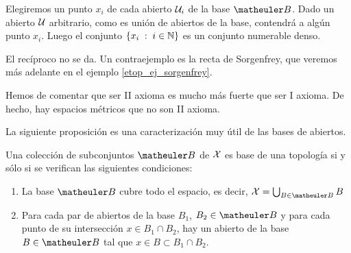 \begin{obs}
	Elegiremos un punto $x_i$ de cada abierto $\mathcal{U}_i$ de la base $\B$. Dado un abierto $\mathcal{U}$ arbitrario, como es unión de abiertos de la base, contendrá a algún punto $x_i$. Luego el conjunto $\{x_i\;:\; i\in\mathbb{N}\}$ es un conjunto numerable denso.
	
	El recíproco no se da. Un contraejemplo es la recta de Sorgenfrey, que veremos más adelante en el ejemplo \ref{etop_ej_sorgenfrey}.
\end{obs}

Hemos de comentar que ser II axioma es mucho más fuerte que ser I axioma. De hecho, hay espacios métricos que no son II axioma.

La siguiente proposición es una caracterización muy útil de las bases de abiertos.
\begin{prop}
	\label{etop_base_top}
	Una colección de subconjuntos $\B$ de $\mathcal{X}$ es base de una topología si y sólo si se verifican las siguientes condiciones:
	\begin{enumerate}
		\item La base $\B$ cubre todo el espacio, es decir, $\X = \bigcup_{B \in \B}B$
		\item Para cada par de abiertos de la base $B_1$, $B_2 \in \B$ y para cada punto de su intersección $x \in B_1 \cap B_2$,  hay un abierto de la base $B \in \B$ tal que $x\in B \subset B_1 \cap B_2$.
	\end{enumerate}
\end{prop}
